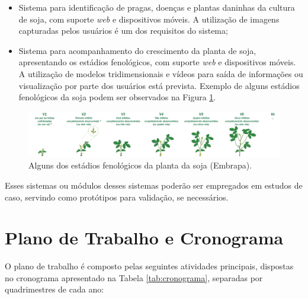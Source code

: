 \documentclass[12pt]{article}
\begin{document}
\begin{itemize}
	\item Sistema para identificação de pragas, doenças e plantas daninhas da cultura de soja, com suporte \textit{web} e dispositivos móveis. A utilização de imagens capturadas pelos usuários é um dos requisitos do sistema;

	\item Sistema para acompanhamento do crescimento da planta de soja, apresentando os estádios fenológicos, com suporte \textit{web} e dispositivos móveis. A utilização de modelos tridimensionais e vídeos para saída de informações ou visualização por parte dos usuários está prevista. Exemplo de alguns estádios fenológicos da soja podem ser observados na Figura \ref{fig:estadios_fenelogicos}.
\end{itemize}

\begin{figure}
	\centering
  \includegraphics[scale=0.5]{images/EstadiosFenologicos.png}
  \caption{Alguns dos estádios fenológicos da planta da soja (Embrapa).}
  \label{fig:estadios_fenelogicos}
\end{figure} 

Esses sistemas ou módulos desses sistemas poderão ser empregados em estudos de caso, servindo como protótipos para validação, se necessários. 

\section{Plano de Trabalho e Cronograma}
\label{sec:plano_trabalho_cronograma}

O plano de trabalho é composto pelas seguintes atividades principais, dispostas no cronograma apresentado na Tabela \ref{tab:cronograma}, separadas por quadrimestres de cada ano:
\end{document}
